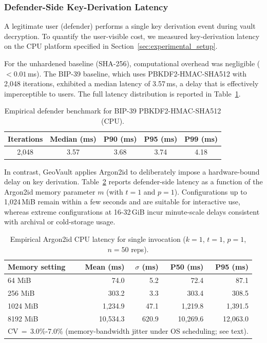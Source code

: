 \documentclass[journal,article,submit,pdftex,moreauthors]{Definitions/mdpi}
\begin{document}
\subsubsection{Defender-Side Key-Derivation Latency}
\label{sec:defender_performance}

A legitimate user (defender) performs a single key derivation event during vault decryption. To quantify the user-visible cost, we measured key-derivation latency on the CPU platform specified in Section~\ref{sec:experimental_setup}.

For the unhardened baseline (SHA-256), computational overhead was negligible ($<0.01$\,ms). The BIP-39 baseline, which uses PBKDF2-HMAC-SHA512 with 2{,}048 iterations, exhibited a median latency of 3.57\,ms, a delay that is effectively imperceptible to users. The full latency distribution is reported in Table~\ref{tab:defender_cost_bip39}.

\begin{table}[H]
\caption{Empirical defender benchmark for BIP-39 PBKDF2-HMAC-SHA512 (CPU).}
\label{tab:defender_cost_bip39}
\centering
\begin{tabular}{ccccc}
\toprule
\textbf{Iterations} & \textbf{Median (ms)} & \textbf{P90 (ms)} & \textbf{P95 (ms)} & \textbf{P99 (ms)} \\
\midrule
2{,}048 & 3.57 & 3.68 & 3.74 & 4.18 \\
\bottomrule
\end{tabular}
\end{table}

In contrast, GeoVault applies Argon2id to deliberately impose a hardware-bound delay on key derivation. Table~\ref{tab:argon2_defender_cost} reports defender-side latency as a function of the Argon2id memory parameter $m$ (with $t=1$ and $p=1$). Configurations up to 1{,}024\,MiB remain within a few seconds and are suitable for interactive use, whereas extreme configurations at 16-32\,GiB incur minute-scale delays consistent with archival or cold-storage usage.

\begin{table}[H]
\caption{Empirical Argon2id CPU latency for single invocation ($k=1$, $t=1$, $p=1$, $n=50$ reps).}
\label{tab:argon2_defender_cost}
\centering
\begin{tabular}{lrrrr}
\toprule
\textbf{Memory setting} & \textbf{Mean (ms)} & \textbf{$\sigma$ (ms)} & \textbf{P50 (ms)} & \textbf{P95 (ms)} \\
\midrule
64 MiB   & 74.0        & 5.2         & 72.4        & 87.1        \\
256 MiB  & 303.2       & 3.3         & 303.4       & 308.5       \\
1024 MiB & 1{,}234.9   & 47.1        & 1{,}219.8   & 1{,}391.5   \\
8192 MiB & 10{,}534.3  & 620.9       & 10{,}269.6  & 12{,}063.0  \\
\bottomrule
\multicolumn{5}{l}{\footnotesize CV\,$=$\,3.0\%-7.0\% (memory-bandwidth jitter under OS scheduling; see text).}
\end{tabular}
\end{table}
\end{document}
